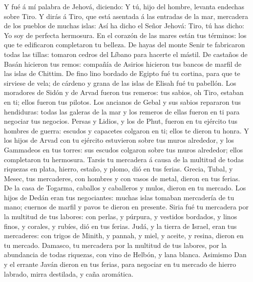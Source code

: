  Y fué á mí palabra de Jehová, diciendo:  Y
tú, hijo del hombre, levanta endechas sobre Tiro.  Y dirás
á Tiro, que está asentada á las entradas de la mar, mercadera de los
pueblos de muchas islas: Así ha dicho el Señor Jehová: Tiro, tú has
dicho: Yo soy de perfecta hermosura.  En el corazón de las
mares están tus términos: los que te edificaron completaron tu belleza.
 De hayas del monte Senir te fabricaron todas las tillas:
tomaron cedros del Líbano para hacerte el mástil.  De
castaños de Basán hicieron tus remos: compañía de Asirios hicieron tus
bancos de marfil de las islas de Chittim.  De fino lino
bordado de Egipto fué tu cortina, para que te sirviese de vela; de
cárdeno y grana de las islas de Elisah fué tu pabellón. 
Los moradores de Sidón y de Arvad fueron tus remeros: tus sabios, oh
Tiro, estaban en ti; ellos fueron tus pilotos.  Los
ancianos de Gebal y sus sabios repararon tus hendiduras: todas las
galeras de la mar y los remeros de ellas fueron en ti para negociar tus
negocios.  Persas y Lidios, y los de Phut, fueron en tu
ejército tus hombres de guerra: escudos y capacetes colgaron en ti;
ellos te dieron tu honra.  Y los hijos de Arvad con tu
ejército estuvieron sobre tus muros alrededor, y los Gammadeos en tus
torres: sus escudos colgaron sobre tus muros alrededor; ellos
completaron tu hermosura.  Tarsis tu mercadera á causa de
la multitud de todas riquezas en plata, hierro, estaño, y plomo, dió en
tus ferias.  Grecia, Tubal, y Mesec, tus mercaderes, con
hombres y con vasos de metal, dieron en tus ferias.  De
la casa de Togarma, caballos y caballeros y mulos, dieron en tu mercado.
 Los hijos de Dedán eran tus negociantes: muchas islas
tomaban mercadería de tu mano; cuernos de marfil y pavos te dieron en
presente.  Siria fué tu mercadera por la multitud de tus
labores: con perlas, y púrpura, y vestidos bordados, y linos finos, y
corales, y rubíes, dió en tus ferias.  Judá, y la tierra
de Israel, eran tus mercaderes: con trigos de Minith, y pannah, y miel,
y aceite, y resina, dieron en tu mercado.  Damasco, tu
mercadera por la multitud de tus labores, por la abundancia de todas
riquezas, con vino de Helbón, y lana blanca.  Asimismo
Dan y el errante Javán dieron en tus ferias, para negociar en tu mercado
de hierro labrado, mirra destilada, y caña aromática. 

